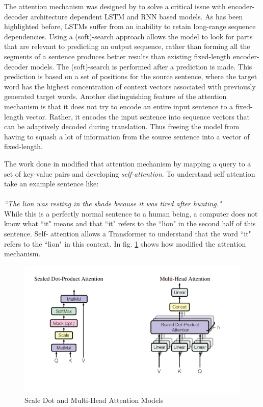 \documentclass[a4paper,12pt]{report}
\begin{document}
            The attention mechanism was designed by \citep{attentioneMech} to solve a critical issue with encoder-decoder architecture dependent LSTM and RNN based models. As has been highlighted before, LSTMs suffer from an inability to retain long-range sequence dependencies. Using a (soft)-search approach allows the model to look for parts that are relevant to predicting an output sequence, rather than forming all the segments of a sentence produces better results than existing fixed-length encoder-decoder models.
            The (soft)-search is performed after a prediction is made. This prediction is based on a set of positions for the source sentence, where the target word has the highest concentration of context vectors associated with previously generated target words. Another distinguishing feature of the attention mechanism is that it does not try to encode an entire input sentence to a fixed-length vector. Rather, it encodes the input sentence into sequence vectors that can be adaptively decoded during translation. Thus freeing the model from having to squash a lot of information from the source sentence into a vector of fixed-length.

			The work done in \citep{atayl} modified that attention mechanism by mapping a query to a set of key-value pairs and developing \textit{self-attention}. To understand self attention take an example sentence like:
            \\\\
            \textit{``The lion was resting in the shade because it was tired after hunting."}\\

             While this is a perfectly normal sentence to a human being, a computer does not know what ``it" means and that ``it" refers to the ``lion" in the second half of this sentence. Self- attention allows a Transformer to understand that the word ``it" refers to the ``lion" in this context.
             In fig. \ref{multiHeadAttention} shows how \citep{atayl} modified the attention mechanism.
			\begin{figure}[h!]
				\centering
				\includegraphics[scale=0.4]{../images/multihead.png}
				\caption{Scale Dot and Multi-Head Attention Models \citep{atayl}}\label{multiHeadAttention}
			\end{figure}
\end{document}
